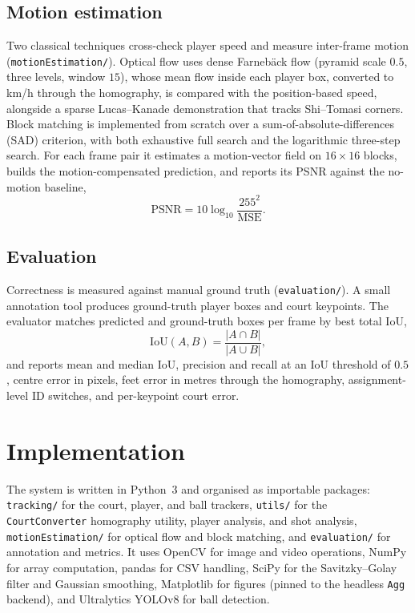 \documentclass[11pt]{article}
\begin{document}
\subsection{Motion estimation}
Two classical techniques cross-check player speed and measure inter-frame motion (\texttt{motionEstimation/}). Optical flow uses dense Farneb\"ack flow (pyramid scale $0.5$, three levels, window $15$), whose mean flow inside each player box, converted to km/h through the homography, is compared with the position-based speed, alongside a sparse Lucas--Kanade demonstration that tracks Shi--Tomasi corners. Block matching is implemented from scratch over a sum-of-absolute-differences (SAD) criterion, with both exhaustive full search and the logarithmic three-step search. For each frame pair it estimates a motion-vector field on $16\times16$ blocks, builds the motion-compensated prediction, and reports its PSNR against the no-motion baseline,
\begin{equation}
\text{PSNR} = 10\log_{10}\frac{255^2}{\text{MSE}}.
\end{equation}

\subsection{Evaluation}
Correctness is measured against manual ground truth (\texttt{evaluation/}). A small annotation tool produces ground-truth player boxes and court keypoints. The evaluator matches predicted and ground-truth boxes per frame by best total IoU,
\begin{equation}
\text{IoU}(A,B) = \frac{|A\cap B|}{|A\cup B|},
\end{equation}
and reports mean and median IoU, precision and recall at an IoU threshold of $0.5$, centre error in pixels, feet error in metres through the homography, assignment-level ID switches, and per-keypoint court error.

\section{Implementation}
The system is written in Python~3 and organised as importable packages: \texttt{tracking/} for the court, player, and ball trackers, \texttt{utils/} for the \texttt{CourtConverter} homography utility, player analysis, and shot analysis, \texttt{motionEstimation/} for optical flow and block matching, and \texttt{evaluation/} for annotation and metrics. It uses OpenCV for image and video operations, NumPy for array computation, pandas for CSV handling, SciPy for the Savitzky--Golay filter and Gaussian smoothing, Matplotlib for figures (pinned to the headless \texttt{Agg} backend), and Ultralytics YOLOv8 for ball detection.
\end{document}
